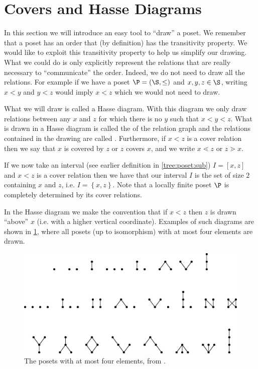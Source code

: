 \section{Covers and Hasse Diagrams}
\label{tree:poset:hasse}


In this section we will introduce an easy tool to ``draw'' a poset. We remember
that a poset has an order that (by definition) has the transitivity property.
We would like to exploit this transitivity property to help us simplify our
drawing. What we could do is only explicitly represent the relations that are
really necessary to ``communicate'' the order. Indeed, we do not need to draw
all the relations. For example if we have a poset $\P = (\S, \le)$ and $x, y, z
\in \S$, writing $x < y$ and $y < z$ would imply $x < z$ which we would not need
to draw.


What we will draw is called a Hasse diagram. With this diagram we only draw
relations between any $x$ and $z$ for which there is no $y$ such that $x < y <
z$.
What is drawn in a Hasse diagram is called the 
of the relation graph and the relations contained in the drawing are called
. Furthermore, if $x < z$ is a cover relation then we
say that $x$ is covered by $z$ or $z$ covers $x$, and we write $x \lessdot z$
or $z \gtrdot x$.


If we now take an interval (see earlier definition in \ref{tree:poset:sub}) $I
= [x, z]$ and $x < z$ is a cover relation then we have that our interval $I$ is
the set of size $2$ containing $x$ and $z$, i.e. $I = \left\{{x, z}\right\}$.
Note that a locally finite poset $\P$ is completely determined by its cover
relations.

In the Hasse diagram we make the convention that if $x < z$ then $z$ is drawn
``above'' $x$ (i.e. with a higher vertical coordinate). Examples of such
diagrams are shown in \ref{fig:stanley:3-1}, where all posets (up to
isomorphism) with at most four elements are drawn.


\begin{figure}
	\centering
	\includegraphics[width=\textwidth]{fig/stanley/3-1}
	\caption{\label{fig:stanley:3-1} The posets with at most four elements,
from \citet*{Stanley:2011:ECV:2124415}.}
\end{figure}


